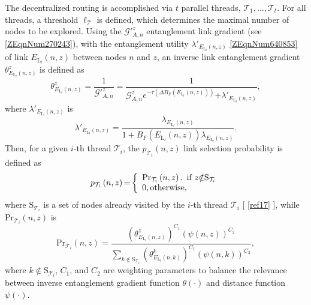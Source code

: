 \documentclass[11pt]{article}%
\newcommand*{\cref}[1]{%
  \begingroup
    \hypersetup{
      linkcolor=linkequation,
      linkbordercolor=linkequation,
    }%
    \ref{#1}%
  \endgroup
}
\begin{document}
 The decentralized routing is accomplished via $t$ parallel threads, ${\mathcal{T}}_{\mathrm{1}}\mathrm{,\dots ,}{\mathcal{T}}_t$. For all threads, a threshold ${\ell }_{\mathcal{T}}$ is defined, which determines the maximal number of nodes to be explored. Using the ${\mathcal{G}}'^z_{A,n}$ entanglement link gradient (see \eqref{ZEqnNum270243}), with the entanglement utility ${\lambda }'_{E_{{\mathrm{L}}_l}\left(n,z\right)}$ \eqref{ZEqnNum640853} of link $E_{{\mathrm{L}}_l}\left(n,z\right)$ between nodes $n$ and $z$, an inverse link entanglement gradient ${\theta }^z_{E_{{\mathrm{L}}_l}\left(n,z\right)}$ is defined as
\begin{equation} \label{ZEqnNum356733} 
{\theta }^z_{E_{{\mathrm{L}}_l}\left(n,z\right)}\mathrm{=}\frac{\mathrm{1}}{{\mathcal{G}}'^z_{A,n}}\mathrm{=}\frac{\mathrm{1}}{{\mathcal{G}}^z_{A,n}e^{\mathrm{-}\tau \left(\mathit{\Delta}B_F\left(E_{{\mathrm{L}}_l}\left(n,z\right)\right)\right)}\mathrm{+}{\lambda }'_{E_{{\mathrm{L}}_l}\left(n,z\right)}},                                                
\end{equation} 
where ${\lambda }'_{E_{{\mathrm{L}}_l}\left(n,z\right)}$ is
\begin{equation} \label{40)} 
{\lambda }'_{E_{{\mathrm{L}}_l}\left(n,z\right)}\mathrm{=}\frac{{\lambda }_{E_{{\mathrm{L}}_l}\left(n,z\right)}}{\mathrm{1+}B_F\left(E_{{\mathrm{L}}_l}\left(n,z\right)\right){\lambda }_{E_{{\mathrm{L}}_l}\left(n,z\right)}}. 
\end{equation} 
Then, for a given $i$-th thread ${\mathcal{T}}_i$, the $p_{{\mathcal{T}}_i}\left(n,z\right)$ link selection probability is defined as
\begin{equation} \label{ZEqnNum706918} 
p_{{\mathcal{T}}_i}\left(n,z\right)\mathrm{=}\left\{ \begin{array}{l}
\mathrm{P}{\mathrm{r}}_{{\mathcal{T}}_i}\left(n,z\right),\textnormal{ if }z\mathrm{\notin }{\mathrm{S}}_{{\mathcal{T}}_i} \\ 
\mathrm{0,otherwise,} \end{array}
\right. 
\end{equation} 
where ${\mathrm{S}}_{{\mathcal{T}}_i}$ is a set of nodes already visited by the $i$-th thread ${\mathcal{T}}_i$ [\cref{ref17}], while $\mathrm{P}{\mathrm{r}}_{{\mathcal{T}}_i}\left(n,z\right)$ is
\begin{equation} \label{ZEqnNum252838} 
\mathrm{P}{\mathrm{r}}_{{\mathcal{T}}_i}\left(n,z\right)\mathrm{=}\frac{{\left({\theta }^z_{E_{{\mathrm{L}}_l}\left(n,z\right)}\right)}^{C_{\mathrm{1}}}{\left(\psi \left(n,z\right)\right)}^{C_{\mathrm{2}}}}{\sum_{k\mathrm{\notin }{\mathrm{S}}_{{\mathcal{T}}_i}}{{\left({\theta }^k_{E_{{\mathrm{L}}_l}\left(n,k\right)}\right)}^{C_{\mathrm{1}}}{\left(\psi \left(n,k\right)\right)}^{C_{\mathrm{2}}}}},                                                            
\end{equation} 
where $k\mathrm{\notin }{\mathrm{S}}_{{\mathcal{T}}_i}$, $C_{\mathrm{1}}$, and $C_{\mathrm{2}}$ are weighting parameters to balance the relevance between inverse entanglement gradient function $\theta \left(\mathrm{\cdot }\right)$ and distance function $\psi \left(\mathrm{\cdot }\right)$. 
\end{document}
